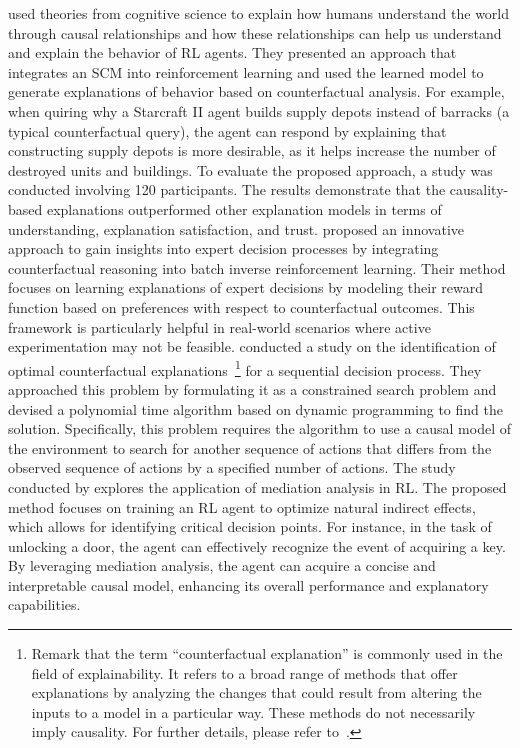 \documentclass[10pt]{article} %
\theoremstyle{definition}
\begin{document}
\citet{madumalExplainableReinforcementLearning2020a} used theories from cognitive science to explain how humans understand the world through causal relationships and how these relationships can help us understand and explain the behavior of RL agents. They presented an approach that integrates an SCM into reinforcement learning and used the learned model to generate explanations of behavior based on counterfactual analysis. For example, when quiring why a Starcraft II agent builds supply depots instead of barracks (a typical counterfactual query), the agent can respond by explaining that constructing supply depots is more desirable, as it helps increase the number of destroyed units and buildings. To evaluate the proposed approach, a study was conducted involving 120 participants. The results demonstrate that the causality-based explanations outperformed other explanation models in terms of understanding, explanation satisfaction, and trust.
\citet{bicaLearningWhatifExplanations2021a} proposed an innovative approach to gain insights into expert decision processes by integrating counterfactual reasoning into batch inverse reinforcement learning. Their method focuses on learning explanations of expert decisions by modeling their reward function based on preferences with respect to counterfactual outcomes. This framework is particularly helpful in real-world scenarios where active experimentation may not be feasible.
\citet{tsirtsisCounterfactualExplanationsSequential2021a} conducted a study on the identification of optimal counterfactual explanations~\footnote{Remark that the term ``counterfactual explanation'' is commonly used in the field of explainability. It refers to a broad range of methods that offer explanations by analyzing the changes that could result from altering the inputs to a model in a particular way. These methods do not necessarily imply causality. For further details, please refer to~\citet{vermaCounterfactualExplanationsAlgorithmic2022}.} for a sequential decision process. They approached this problem by formulating it as a constrained search problem and devised a polynomial time algorithm based on dynamic programming to find the solution. Specifically, this problem requires the algorithm to use a causal model of the environment to search for another sequence of actions that differs from the observed sequence of actions by a specified number of actions. 
The study conducted by \citet{herlauReinforcementLearningCausal2022a} explores the application of mediation analysis in RL. The proposed method focuses on training an RL agent to optimize natural indirect effects, which allows for identifying critical decision points. For instance, in the task of unlocking a door, the agent can effectively recognize the event of acquiring a key. By leveraging mediation analysis, the agent can acquire a concise and interpretable causal model, enhancing its overall performance and explanatory capabilities.
\end{document}
